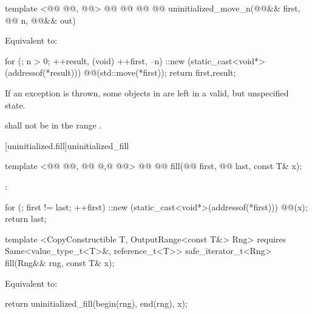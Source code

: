 \begin{codeblock}
  template <@@ @@, @@>
    @@
             @@
             @@
  @@
    uninitialized_move_n(@@&& first, @@ n, @@&& out)
\end{codeblock}


\pnum
\effects Equivalent to:
\begin{codeblock}
        for (; n > 0; ++result, (void) ++first, --n)
          ::new (static_cast<void*>(addressof(*result)))
            @@(std::move(*first));
        return {first,result};
\end{codeblock}

\pnum
\remarks If an exception is thrown, some objects in \tcode{[first, next(first, n))} are left in a valid, but unspecified state.

{\color{addclr}
\pnum
\requires {} shall not be in the range \tcode{[first, next(first, n))}.
} %

[uninitialized.fill]{uninitialized_fill}
\begin{codeblock}
  template <@@ @@, @@ @,@
            @@>
    @@
    @@ fill(@@ first, @@ last, const T& x);
\end{codeblock}

\setcounter{Paras}{0}
\pnum
\effects {}:
\begin{codeblock}
        for (; first != last; ++first)
           ::new (static_cast<void*>(addressof(*first)))
              @@(x);
        return last;
\end{codeblock}
{\color{addclr}
\begin{codeblock}
  template <CopyConstructible T, OutputRange<const T&> Rng>
    requires Same<value_type_t<T>&, reference_t<T>>
  safe_iterator_t<Rng>
    fill(Rng&& rng, const T& x);
\end{codeblock}

\pnum
\effects Equivalent to:
\begin{codeblock}
        return uninitialized_fill(begin(rng), end(rng), x);
\end{codeblock}
} %

